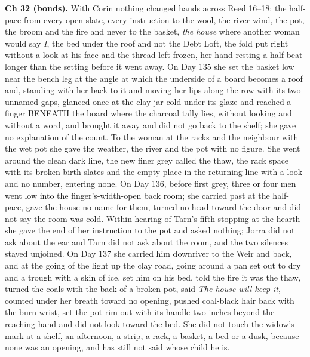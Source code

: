 \documentclass{design/chronicle}
\begin{document}
{\textbf{Ch 32 (bonds).} With Corin nothing changed hands across Reed 16–18: the half-pace from every open slate, every instruction to the wool, the river wind, the pot, the broom and the fire and never to the basket, \emph{the house} where another woman would say \emph{I}, the bed under the roof and not the Debt Loft, the fold put right without a look at his face and the thread left frozen, her hand resting a half-beat longer than the setting before it went away. On Day 135 she set the basket low near the bench leg at the angle at which the underside of a board becomes a roof and, standing with her back to it and moving her lips along the row with its two unnamed gaps, glanced once at the clay jar cold under its glaze and reached a finger BENEATH the board where the charcoal tally lies, without looking and without a word, and brought it away and did not go back to the shelf; she gave no explanation of the count. To the woman at the racks and the neighbour with the wet pot she gave the weather, the river and the pot with no figure. She went around the clean dark line, the new finer grey called the thaw, the rack space with its broken birth-slates and the empty place in the returning line with a look and no number, entering none. On Day 136, before first grey, three or four men went low into the finger’s-width-open back room; she carried past at the half-pace, gave the house no name for them, turned no head toward the door and did not say the room was cold. Within hearing of Tarn’s fifth stopping at the hearth she gave the end of her instruction to the pot and asked nothing; Jorra did not ask about the ear and Tarn did not ask about the room, and the two silences stayed unjoined. On Day 137 she carried him downriver to the Weir and back, and at the going of the light up the clay road, going around a pan set out to dry and a trough with a skin of ice, set him on his bed, told the fire it was the thaw, turned the coals with the back of a broken pot, said \emph{The house will keep it}, counted under her breath toward no opening, pushed coal-black hair back with the burn-wrist, set the pot rim out with its handle two inches beyond the reaching hand and did not look toward the bed. She did not touch the widow’s mark at a shelf, an afternoon, a strip, a rack, a basket, a bed or a dusk, because none was an opening, and has still not said whose child he is.

}
\end{document}
